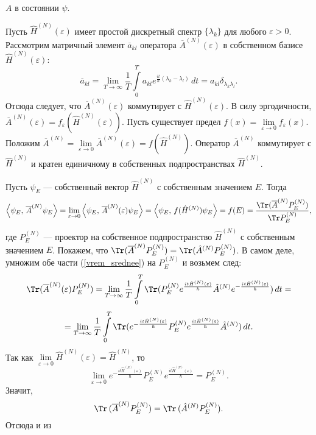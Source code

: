 \documentclass[a4paper
]{article}
\begin{document}
$A$ в состоянии $\psi$. \par
Пусть $\hat H^{(N)}(\varepsilon)$ имеет простой дискретный спектр $\{\lambda_k\}$
для любого $\varepsilon>0$. Рассмотрим матричный элемент $\overline{a}
_{kl}$ оператора $\overline A^{(N)}(\varepsilon)$ в собственном
базисе $\hat H^{(N)}(\varepsilon)$:
$$\overline a_{kl}=\lim \limits_{T\rightarrow \infty}\frac{1}{T}\int
\limits_0^T a_{kl}e^{\frac{it}{\hbar}(\lambda_k-\lambda_l)}\, dt=
a_{kl}\delta_{\lambda_k\lambda_l}.$$ Отсюда следует, что $\overline
A^{(N)}(\varepsilon)$ коммутирует с $\hat H^{(N)}(\varepsilon)$.
В силу эргодичности, $\overline A^{(N)}(\varepsilon)=f_\varepsilon
(\hat H^{(N)}(\varepsilon))$. Пусть существует предел $f(x)=\lim
\limits_{\varepsilon\rightarrow 0}f_\varepsilon(x)$. Положим $\overline
A^{(N)}=\lim \limits_{\varepsilon\rightarrow 0}\overline A^{(N)}
(\varepsilon)=f(\hat H^{(N)})$.
Оператор $\overline A^{(N)}$ коммутирует с $\hat H^{(N)}$ и кратен единичному
в собственных подпространствах $\hat H^{(N)}$. \par
Пусть $\psi_E$ --- собственный вектор $\hat H^{(N)}$ с собственным
значением $E$. Тогда
\begin{align}
\label{vrem_srednee_proj}
\left\langle \psi_E, \, \overline A^{(N)}\psi_E\right\rangle=\lim \limits
_{\varepsilon\rightarrow 0}\left\langle \psi_E, \, \overline A^{(N)}
(\varepsilon)\psi_E\right\rangle=\left\langle \psi_E, \, f(\hat H^{(N)})
\psi_E\right\rangle=f(E)=\frac{\Tr(\overline A^{(N)} P_E^{(N)})}
{\Tr P_E^{(N)}},
\end{align}
где $P_E^{(N)}$ --- проектор на собственное подпространство $\hat H^{(N)}$
с собственным значением $E$. Покажем, что $\Tr(\overline A^{(N)} P_E^{(N)})=
\Tr(\hat A^{(N)} P_E^{(N)})$. В самом деле, умножим обе части
(\ref{vrem_srednee}) на $P_E^{(N)}$ и возьмем след:
$$\Tr (\overline A^{(N)}(\varepsilon)P_E^{(N)})=\lim \limits_{T\rightarrow
\infty}\frac{1}{T}\int \limits_0^T \Tr (P_E^{(N)}e^{\frac{it\hat H^{(N)}
(\varepsilon)}{\hbar}}\hat A^{(N)}e^{-\frac{it\hat H^{(N)}(\varepsilon)}{\hbar}})
\, dt=$$ $$=\lim\limits _{T\rightarrow \infty}\frac{1}{T}\int \limits_0^T
\Tr (e^{-\frac{it\hat H^{(N)}(\varepsilon)}{\hbar}}P_E^{(N)} e^{\frac{it\hat
H^{(N)}(\varepsilon)}{\hbar}}\hat A^{(N)})\, dt.$$ Так как
$\lim \limits_{\varepsilon \rightarrow 0}\hat H^{(N)}(\varepsilon)=
\hat H^{(N)}$, то $$\lim \limits_{\varepsilon\rightarrow 0}e^{-\frac{it\hat
H^{(N)}(\varepsilon)}{\hbar}}P_E^{(N)} e^{\frac{it\hat H^{(N)}(\varepsilon)}
{\hbar}}=P_E^{(N)}.$$ Значит, $$\Tr\, (\overline A^{(N)}
P_E^{(N)})=\Tr\, (\hat A^{(N)}P_E^{(N)}).$$ Отсюда и из
\end{document}
